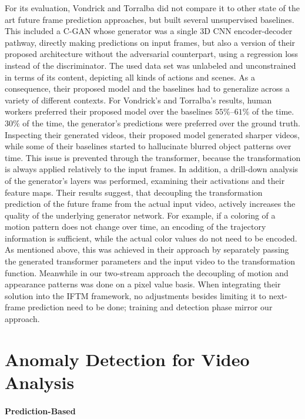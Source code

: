 For its evaluation, Vondrick and Torralba did not compare it to other state of the art future frame prediction approaches, but built several unsupervised baselines. This included a C-GAN whose generator was a single 3D CNN encoder-decoder pathway, directly making predictions on input frames, but also a version of their proposed architecture without the adversarial counterpart, using a regression loss instead of the discriminator. The used data set was unlabeled and unconstrained in terms of its content, depicting all kinds of actions and scenes. As a consequence, their proposed model and the baselines had to generalize across a variety of different contexts. For Vondrick's and Torralba's results, human workers preferred their proposed model over the baselines $55\%$--$61\%$ of the time. $30\%$ of the time, the generator's predictions were preferred over the ground truth. Inspecting their generated videos, their proposed model generated sharper videos, while some of their baselines started to hallucinate blurred object patterns over time. This issue is prevented through the transformer, because the transformation is always applied relatively to the input frames. In addition, a drill-down analysis of the generator's layers was performed, examining their activations and their feature maps. Their results suggest, that decoupling the transformation prediction of the future frame from the actual input video, actively increases the quality of the underlying generator network. For example, if a coloring of a motion pattern does not change over time, an encoding of the trajectory information is sufficient, while the actual color values do not need to be encoded. As mentioned above, this was achieved in their approach by separately passing the generated transformer parameters and the input video to the transformation function. Meanwhile in our two-stream approach the decoupling of motion and appearance patterns was done on a pixel value basis. When integrating their solution into the IFTM framework, no adjustments besides limiting it to next-frame prediction need to be done; training and detection phase mirror our approach.

\section{Anomaly Detection for Video Analysis} \label{sec:rel_vad}

\paragraph{Prediction-Based} 

